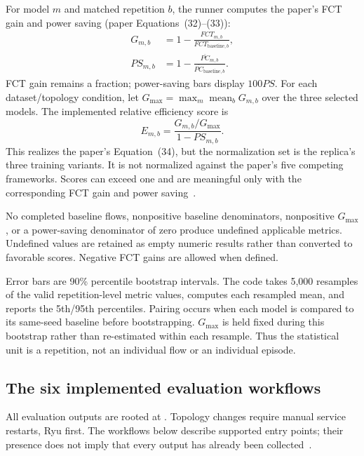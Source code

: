 \documentclass[11pt,a4paper]{article}
\begin{document}
For model $m$ and matched repetition $b$, the runner computes the paper's
FCT gain and power saving (paper Equations~(32)--(33)):
\begin{align}
 G_{m,b}&=1-\frac{FCT_{m,b}}{FCT_{\mathrm{baseline},b}},\\
 PS_{m,b}&=1-\frac{\overline{PC}_{m,b}}
                   {\overline{PC}_{\mathrm{baseline},b}}.
 \label{eq:gains}
\end{align}
FCT gain remains a fraction; power-saving bars display $100PS$. For each
dataset/topology condition, let
$G_{\max}=\max_m\operatorname{mean}_bG_{m,b}$ over the three selected models.
The implemented relative efficiency score is
\begin{equation}
 E_{m,b}=\frac{G_{m,b}/G_{\max}}{1-PS_{m,b}}.
 \label{eq:efficiency}
\end{equation}
This realizes the paper's Equation~(34), but the normalization set is the
replica's three training variants. It is not normalized against the paper's
five competing frameworks. Scores can exceed one and are meaningful only
with the corresponding FCT gain and power saving~\cite{code-plots}.

No completed baseline flows, nonpositive baseline denominators, nonpositive
$G_{\max}$, or a power-saving denominator of zero produce undefined applicable
metrics. Undefined values are retained as empty numeric results rather than
converted to favorable scores. Negative FCT gains are allowed when defined.

Error bars are 90\% percentile bootstrap intervals. The code takes 5,000
resamples of the valid repetition-level metric values, computes each resampled
mean, and reports the 5th/95th percentiles. Pairing occurs when each model is
compared to its same-seed baseline before bootstrapping. $G_{\max}$ is held
fixed during this bootstrap rather than re-estimated within each resample.
Thus the statistical unit is a repetition, not an individual flow or an
individual episode.

\subsection{The six implemented evaluation workflows}
\label{sec:eval-workflows}

All evaluation outputs are rooted at . Topology changes require
manual service restarts, Ryu first. The workflows below describe supported
entry points; their presence does not imply that every output has already
been collected~\cite{code-eval-entrypoints}.
\end{document}
